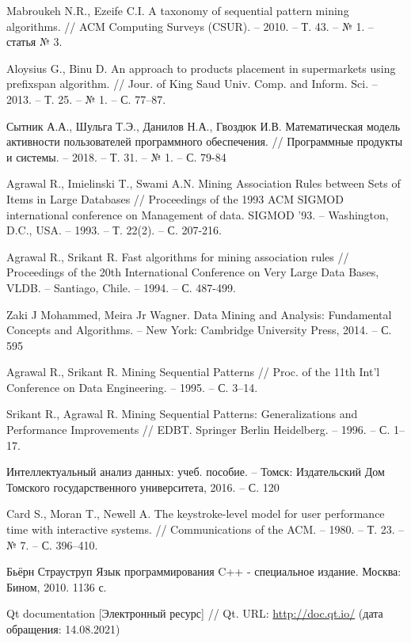 \begin{thebibliography}{1}
	Mabroukeh N.R., Ezeife C.I.
	A taxonomy of sequential pattern mining algorithms.
	// ACM Computing Surveys (CSUR). -- 2010. -- Т. 43. -- № 1. -- статья № 3.
	
	Aloysius G., Binu D.
	An approach to products placement in supermarkets using prefixspan algorithm.
	// Jour. of King Saud Univ. Comp. and Inform. Sci. -- 2013. -- Т. 25. -- № 1. -- С. 77–87.
	
	Сытник А.А., Шульга Т.Э., Данилов Н.А., Гвоздюк И.В.
	Математическая модель активности пользователей программного обеспечения.
	// Программные продукты и системы. -- 2018. -- Т. 31. -- № 1. -- С. 79-84 
	
	Agrawal R., Imielinski T., Swami A.N.
	Mining Association Rules between Sets of Items in Large Databases
	// Proceedings of the 1993 ACM SIGMOD international conference on Management of data. SIGMOD '93. -- Washington, D.C., USA. -- 1993. -- Т. 22(2). -- С. 207-216.
	
	Agrawal R., Srikant R.
	Fast algorithms for mining association rules
	// Proceedings of the 20th International Conference on Very Large Data Bases, VLDB. -- Santiago, Chile. -- 1994. -- С. 487-499.
	
	Zaki J Mohammed, Meira Jr Wagner. Data Mining and Analysis: Fundamental Concepts and Algorithms. -- New York: Cambridge University Press, 2014. -- С. 595
	
	Agrawal R., Srikant R. Mining Sequential Patterns // Proc. of the 11th Int’l
	Conference on Data Engineering. -- 1995. -- С. 3–14.
	
	Srikant R., Agrawal R. Mining Sequential Patterns: Generalizations and
	Performance Improvements // EDBT. Springer Berlin Heidelberg. -- 1996.
	-- С. 1–17.
	
	Интеллектуальный анализ данных: учеб. пособие. --
	Томск: Издательский Дом Томского государственного
	университета, 2016. -- С. 120
	
	Card S., Moran T., Newell A.
	The keystroke-level model for user performance time with interactive systems.
	// Communications of the ACM. -- 1980. -- Т. 23. -- № 7. -- С. 396–410.
	
	
	Бьёрн Страуструп Язык программирования C++ - специальное издание. Москва: Бином, 2010. 1136 с.
	
	Qt documentation [Электронный ресурс] // Qt.
	URL: \url{http://doc.qt.io/}
	(дата обращения: 14.08.2021)
	
	
\end{thebibliography}

